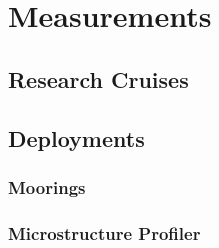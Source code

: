 \chapter{Measurements}
\label{kap-measure}

\section{Research Cruises}

\section{Deployments}

\subsection{Moorings}

\subsection{Microstructure Profiler}